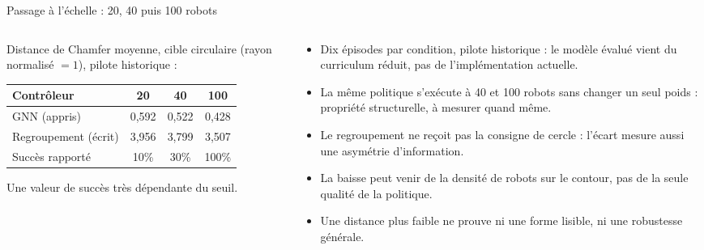 \documentclass[10pt,aspectratio=169]{beamer}
\begin{document}
\begin{frame}{Passage à l'échelle : 20, 40 puis 100 robots}
  \begin{columns}[T]
    \begin{column}{0.5\textwidth}
      Distance de Chamfer moyenne, cible circulaire (rayon normalisé $=1$), pilote historique :\par
      \vspace{0.3em}
      \begin{tabular}{@{}lccc@{}}
        \toprule
        \textbf{Contrôleur} & \textbf{20} & \textbf{40} & \textbf{100} \\
        \midrule
        GNN (appris)        & 0,592 & 0,522 & 0,428 \\
        Regroupement (écrit)& 3,956 & 3,799 & 3,507 \\
        \midrule
        Succès rapporté     & 10\%  & 30\%  & 100\% \\
        \bottomrule
      \end{tabular}
      \vspace{0.5em}
      {\footnotesize\color{swarmmuted} Une valeur de succès très dépendante du seuil.\par}
    \end{column}
    \begin{column}{0.5\textwidth}
      \begin{itemize}\footnotesize
        \item Dix épisodes par condition, pilote historique : le modèle évalué vient du curriculum réduit, pas de l'implémentation actuelle.
        \item La même politique s'exécute à 40 et 100 robots sans changer un seul poids : propriété structurelle, à mesurer quand même.
        \item Le regroupement ne reçoit pas la consigne de cercle : l'écart mesure aussi une asymétrie d'information.
        \item La baisse peut venir de la densité de robots sur le contour, pas de la seule qualité de la politique.
        \item Une distance plus faible ne prouve ni une forme lisible, ni une robustesse générale.
      \end{itemize}
    \end{column}
  \end{columns}
\end{frame}
\end{document}
